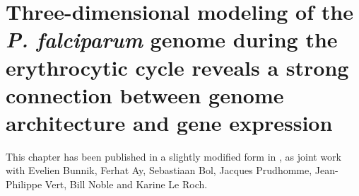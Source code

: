 
\chapter[Genome architecture of the \emph{P. falciparum}
genome]{Three-dimensional modeling of the {\em P. falciparum} genome during
the erythrocytic cycle reveals a strong connection between genome
architecture and gene expression} %
\label{chap:plasmodium}

\graphicspath{{3_plasmodium/}}

\begin{work}

This chapter has been published in a slightly modified form in
\citep{ay:three-dimensional}, as joint work with Evelien Bunnik, Ferhat Ay,
Sebastiaan Bol, Jacques Prudhomme, Jean-Philippe Vert, Bill Noble and Karine
Le Roch.

\end{work}

